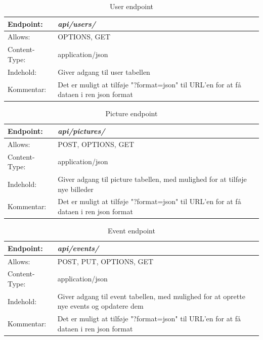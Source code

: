 \begin{table}[H]
\begin{tabular}{| p{3cm}| p{11.5cm}|}
\hline
Endpoint:	 							& \textbf{\textit{api/users/}} \\\hline
Allows:									& OPTIONS, GET\\\hline
Content-Type:						& application/json\\\hline 
Indehold:								& Giver adgang til user tabellen\\\hline 
Kommentar:							& Det er muligt at tilføje "?format=json" til URL'en for at få dataen i ren json format\\\hline
\end{tabular}
\caption{User endpoint}
\label{user_endpoint}
\end{table}

\begin{table}[H]
\begin{tabular}{| p{3cm}| p{11.5cm}|}
\hline
Endpoint:	 							&\textbf{\textit{api/pictures/}} \\\hline
Allows:									& POST, OPTIONS, GET\\\hline
Content-Type:						& application/json\\\hline 
Indehold:								& Giver adgang til picture tabellen, med mulighed for at tilføje nye billeder\\\hline 
Kommentar:							& Det er muligt at tilføje "?format=json" til URL'en for at få dataen i ren json format\\\hline
\end{tabular}
\caption{Picture endpoint}
\label{picture_endpoint}
\end{table}

\begin{table}[H]
\begin{tabular}{| p{3cm}| p{11.5cm}|}
\hline
Endpoint:	 							&\textbf{\textit{api/events/}}\\\hline
Allows:									& POST, PUT, OPTIONS, GET\\\hline
Content-Type:						& application/json\\\hline 
Indehold:								& Giver adgang til event tabellen, med mulighed for at oprette nye events og opdatere dem\\\hline 
Kommentar:							& Det er muligt at tilføje "?format=json" til URL'en for at få dataen i ren json format\\\hline
\end{tabular}
\caption{Event endpoint}
\label{event_endpoint}
\end{table}

